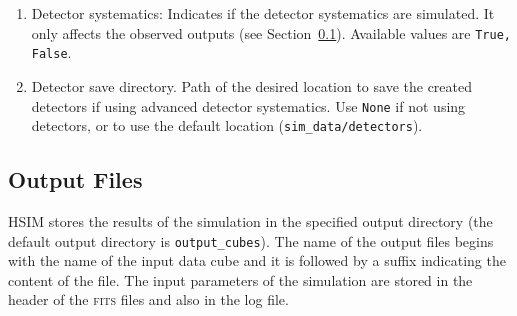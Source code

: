 \documentclass[12pt]{report}
\begin{document}
\begin{enumerate}
\item Detector systematics: Indicates if the detector systematics are simulated. It only affects the observed outputs (see Section~\ref{s:output}). Available values are \texttt{True, False}.
\item Detector save directory. Path of the desired location to save the created detectors if using advanced detector systematics. Use \texttt{None} if not using detectors, or to use the default location (\texttt{sim\_data/detectors}).
\end{enumerate}

\subsection{Output Files}\label{s:output}

HSIM stores the results of the simulation in the specified output directory (the default output directory is \texttt{output\_cubes}). The name of the output files begins with the name of the input data cube and it is followed by a suffix indicating the content of the file. The input parameters of the simulation are stored in the header of the \textsc{fits} files and also in the log file.
\end{document}
